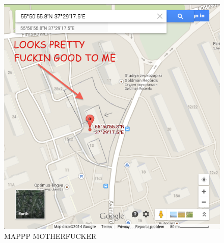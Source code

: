 \documentclass[11pt]{report}
\begin{document}

\begin{figure}[h!c]
    \label{figure69}
  \includegraphics[totalheight=15cm]{motherland-compared.png}
  \caption{MAPPP MOTHERFUCKER}
\end{figure}
\end{document}
